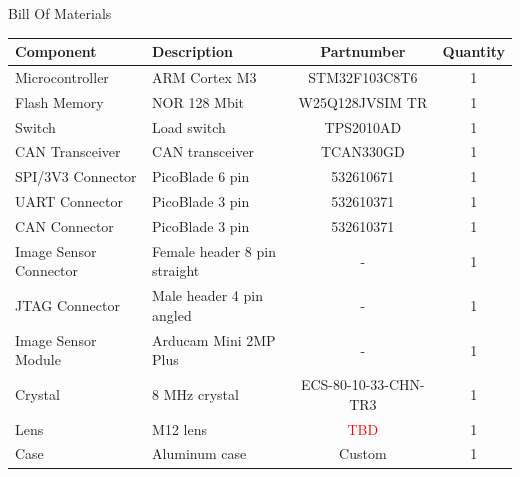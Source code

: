 \begin{frame}{Bill Of Materials}

    \begin{table}[!htb]\tiny
        \centering
        \label{tab:bom}
        \begin{tabular}{lL{2cm}cc}
            \toprule[1.5pt]
            \textbf{Component} & \textbf{Description} & \textbf{Partnumber} & \textbf{Quantity} \\
            \midrule
            Microcontroller        & ARM Cortex M3                & STM32F103C8T6        & 1 \\
            Flash Memory           & NOR 128 Mbit                 & W25Q128JVSIM TR      & 1 \\
            Switch                 & Load switch                  & TPS2010AD            & 1 \\
            CAN Transceiver        & CAN transceiver              & TCAN330GD            & 1 \\
            SPI/3V3 Connector      & PicoBlade 6 pin              & 532610671            & 1 \\
            UART Connector         & PicoBlade 3 pin              & 532610371            & 1 \\
            CAN Connector          & PicoBlade 3 pin              & 532610371            & 1 \\
            Image Sensor Connector & Female header 8 pin straight & -                    & 1 \\
            JTAG Connector         & Male header 4 pin angled     & -                    & 1 \\
            Image Sensor Module    & Arducam Mini 2MP Plus        & -                    & 1 \\
            Crystal                & 8 MHz crystal                & ECS-80-10-33-CHN-TR3 & 1 \\
            Lens                   & M12 lens                     & \textcolor{red}{TBD} & 1 \\
            Case                   & Aluminum case                & Custom               & 1 \\
            \bottomrule[1.5pt]
        \end{tabular}
    \end{table}

\end{frame}


